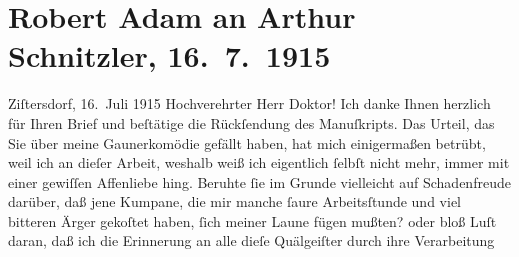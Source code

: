 

         
         \newcommand{\erwaehntePersonen}{Personen: }
         \newcommand{\erwaehnteInstitutionen}{}
         \newcommand{\erwaehnteOrte}{Orte: Wien, Zistersdorf}
         \newcommand{\erwaehnteWerke}{Werke: Die Fackel, Gesellschaft [Eine Gaunerkomödie], Rechtsphilosophie, Sprüche}
               \section[Robert Adam an Arthur Schnitzler, 16. 7. 1915]{ Robert Adam an Arthur Schnitzler, 16. 7. 1915}\nopagebreak{}\rehead{ }\begin{ledgroupsized}[t]{13cm}\normalsize\beginnumbering \toendnotes[C]{\smallbreak\pagebreak[2]} 
\toendnotes[C]{\smallbreak}\pstart
           \raggedleft{}{\pb}Ziſtersdorf, 16. Juli 1915\pend
           \pstart{}Hochverehrter Herr Doktor!\pend\pstart
           Ich danke Ihnen herzlich für Ihren Brief und beſtätige die Rückſendung des Manuſkripts.\pend
           \pstart
           Das Urteil, das Sie über meine Gaunerkomödie gefällt haben, hat mich einigermaßen betrübt, weil ich
                    an dieſer Arbeit, weshalb weiß ich eigentlich ſelbſt nicht mehr, immer mit einer
                    gewiſſen Affenliebe hing. Beruhte ſie im Grunde vielleicht auf Schadenfreude
                    darüber, daß jene Kumpane, die mir manche ſaure Arbeitsſtunde und viel bitteren
                    Ärger gekoſtet haben, ſich meiner Laune fügen mußten? oder bloß \label{T_L02215_1v}\label{T_L02215_1h} Luſt daran,
                    daß ich die Erinnerung an alle dieſe Quälgeiſter durch ihre Verarbeitung

\end{ledgroupsized}
